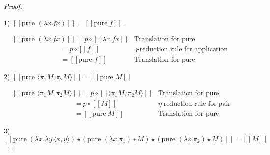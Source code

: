 \documentclass[a4paper]{article}
\begin{document}
\begin{proof}

$ $

1) $[\![\text{pure } (\lambda x. f x)]\!] = [\![\text{pure } f]\!]$.

\vspace{\baselineskip}

$\begin{array}{lll}
&[\![\text{pure } (\lambda x. f x)]\!] = p \circ [\![\lambda x. f x]\!]& \text{Translation for pure} \\
&\quad\quad\quad\quad\quad\quad\quad= p \circ [\![f]\!]& \text{$\eta$-reduction rule for application} \\
&\quad\quad\quad\quad\quad\quad\quad= [\![\text{pure } f ]\!]& \text{Translation for pure}
\end{array}$

\vspace{\baselineskip}

2) $[\![\text{pure } \langle \pi_1 M, \pi_2 M \rangle]\!] = [\![\text{pure } M]\!]$

\vspace{\baselineskip}

$\begin{array}{lll}
&[\![\text{pure } \langle \pi_1 M, \pi_2 M \rangle]\!] = p \circ [\![\langle \pi_1 M, \pi_2 M \rangle]\!]&
\text{Translation for pure} \\
&\quad\quad\quad\quad\quad\quad\quad\quad\quad= p \circ [\![M]\!]& \text{$\eta$-reduction rule for pair} \\
&\quad\quad\quad\quad\quad\quad\quad\quad\quad= [\![\text{pure } M]\!]& \text{Translation for pure}
\end{array}$
\vspace{\baselineskip}

3) $[\![\text{pure } (\lambda x. \lambda y. \langle x, y \rangle) \star (\text{pure } (\lambda x. \pi_1) \star M) \star (\text{pure } (\lambda x. \pi_2) \star M)]\!] = [\![M]\!]$

\vspace{\baselineskip}




\end{proof}
\end{document}
